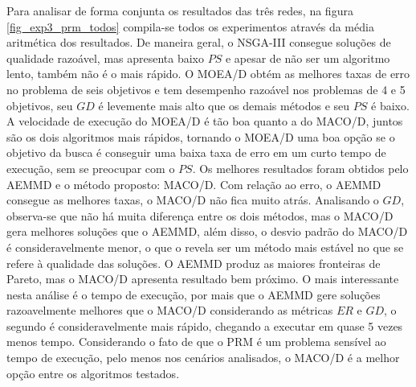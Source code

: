 Para analisar de forma conjunta os resultados das três redes, na figura \ref{fig_exp3_prm_todos} compila-se todos os experimentos através da média aritmética dos resultados. De maneira geral, o NSGA-III consegue soluções de qualidade razoável, mas apresenta baixo $PS$ e apesar de não ser um algoritmo lento, também não é o mais rápido. O MOEA/D obtém as melhores taxas de erro no problema de seis objetivos e tem desempenho razoável nos problemas de 4 e 5 objetivos, seu $GD$ é levemente mais alto que os demais métodos e seu $PS$ é baixo. A velocidade de execução do MOEA/D é tão boa quanto a do MACO/D, juntos são os dois algoritmos mais rápidos, tornando o MOEA/D uma boa opção se o objetivo da busca é conseguir uma baixa taxa de erro em um curto tempo de execução, sem se preocupar com o $PS$. Os melhores resultados foram obtidos pelo AEMMD e o método proposto: MACO/D. Com relação ao erro, o AEMMD consegue as melhores taxas, o MACO/D não fica muito atrás. Analisando o $GD$, observa-se que não há muita diferença entre os dois métodos, mas o MACO/D gera melhores soluções que o AEMMD, além disso, o desvio padrão do MACO/D é consideravelmente menor, o que o revela ser um método mais estável no que se refere à qualidade das soluções. O AEMMD produz as maiores fronteiras de Pareto, mas o MACO/D apresenta resultado bem próximo. O mais interessante nesta análise é o tempo de execução, por mais que o AEMMD gere soluções razoavelmente melhores que o MACO/D considerando as métricas $ER$ e $GD$, o segundo é consideravelmente mais rápido, chegando a executar em quase 5 vezes menos tempo. Considerando o fato de que o PRM é um problema sensível ao tempo de execução, pelo menos nos cenários analisados, o MACO/D é a melhor opção entre os algoritmos testados.

